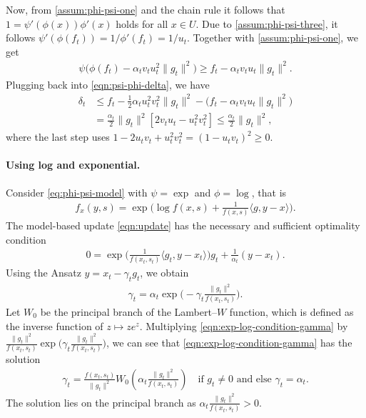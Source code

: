 \documentclass{article}
\let\temp\phi
\let\phi\varphi
\let\varphi\temp
\let\temp\varepsilon
\let\varepsilon\temp
\newcommand{\iprod}[2]{\langle #1, #2 \rangle}
\theoremstyle{plain}
\theoremstyle{definition}
\theoremstyle{remark}
\begin{document}
Now, from \ref{assum:phi-psi-one} and the chain rule it follows that $1 = \psi'(\varphi(x))\varphi'(x)$ holds for all $x\in U$. Due to \ref{assum:phi-psi-three}, it follows $\psi'(\varphi(f_t)) = 1/\varphi'(f_t) = 1/u_t$.
Together with \ref{assum:phi-psi-one}, we get
\begin{align*}
    \psi\big(\varphi(f_t) - \alpha_t v_t u_t^2 \|g_t\|^2\big) \geq f_t - \alpha_t v_t u_t \|g_t\|^2.
\end{align*}
%
Plugging back into \eqref{eqn:psi-phi-delta}, we have
\begin{align*}
    \delta_t &\leq f_t - \frac12 \alpha_t u_t^2 v_t^2 \|g_t\|^2 - \big(f_t - \alpha_t v_t u_t \|g_t\|^2\big)\\
    &= \frac{\alpha_t}{2} \|g_t\|^2 [2v_tu_t - u_t^2 v_t^2] \leq \frac{\alpha_t}{2} \|g_t\|^2,
\end{align*}
where the last step uses $1 -2u_tv_t + u_t^2 v_t^2 = (1-u_tv_t)^2 \geq 0$.
%


\paragraph{Using log and exponential.} Consider \eqref{eq:phi-psi-model} with $\psi = \exp$ and $\varphi = \log$, that is
\begin{align}\label{eqn:ngn-model-exp}
    f_{x}(y,s) = \exp \big(\log{f(x,s)} + \frac{1}{f(x,s)}\iprod{g}{y-x} \big).
\end{align}
The model-based update \eqref{eqn:update} has the necessary and sufficient optimality condition
\begin{align*}
    0 = \exp \big(\tfrac{1}{f(x_t,s_t)}\iprod{g_t}{y-x_t} \big) g_t + \frac{1}{\alpha_t}(y-x_t).
\end{align*}
Using the Ansatz $y=x_t - \gamma_t g_t$, we obtain
\begin{align}\label{eqn:exp-log-condition-gamma}
    \gamma_t = \alpha_t \exp \big(-\gamma_t\frac{\|g_t\|^2}{f(x_t,s_t)}\big).
\end{align}
Let $W_0$ be the principal branch of the Lambert--$W$ function, which is defined as the inverse function of $z\mapsto ze^z$. Multiplying \eqref{eqn:exp-log-condition-gamma} by $\frac{\|g_t\|^2}{f(x_t,s_t)}\exp \big(\gamma_t\frac{\|g_t\|^2}{f(x_t,s_t)}\big)$, we can see that \eqref{eqn:exp-log-condition-gamma} has the solution 
\begin{align}\label{eqn:lambertw-step-size}
    \gamma_t = \frac{f(x_t,s_t)}{\|g_t\|^2} W_0(\alpha_t \frac{\|g_t\|^2}{f(x_t,s_t)}) \quad \text{if } g_t \neq 0
    \text{ and else } \gamma_t=\alpha_t.
\end{align}
The solution lies on the principal branch as $\alpha_t \frac{\|g_t\|^2}{f(x_t,s_t)} > 0$.
\end{document}
